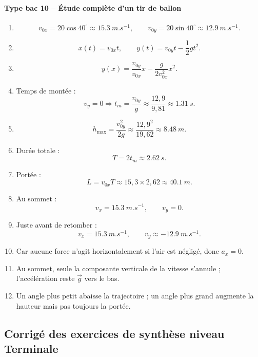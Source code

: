 \documentclass[11pt,a4paper]{article}
\theoremstyle{definition}
\begin{document}
\paragraph{Type bac 10 -- Étude complète d’un tir de ballon}
\begin{enumerate}[label=\arabic*.]
    \item
    \[
    v_{0x}=20\cos40^\circ\approx \SI{15,3}{m.s^{-1}},
    \qquad
    v_{0y}=20\sin40^\circ\approx \SI{12,9}{m.s^{-1}}.
    \]
    \item
    \[
    x(t)=v_{0x}t,\qquad y(t)=v_{0y}t-\frac12 gt^2.
    \]
    \item
    \[
    y(x)=\frac{v_{0y}}{v_{0x}}x-\frac{g}{2v_{0x}^2}x^2.
    \]
    \item Temps de montée :
    \[
    v_y=0 \Rightarrow t_m=\frac{v_{0y}}{g}\approx \frac{12,9}{9,81}\approx \SI{1,31}{s}.
    \]
    \item
    \[
    h_{\max}=\frac{v_{0y}^2}{2g}\approx \frac{12,9^2}{19,62}\approx \SI{8,48}{m}.
    \]
    \item Durée totale :
    \[
    T=2t_m\approx \SI{2,62}{s}.
    \]
    \item Portée :
    \[
    L=v_{0x}T\approx 15,3\times2,62\approx \SI{40,1}{m}.
    \]
    \item Au sommet :
    \[
    v_x=\SI{15,3}{m.s^{-1}},\qquad v_y=0.
    \]
    \item Juste avant de retomber :
    \[
    v_x=\SI{15,3}{m.s^{-1}},\qquad v_y\approx \SI{-12,9}{m.s^{-1}}.
    \]
    \item Car aucune force n’agit horizontalement si l’air est négligé, donc $a_x=0$.
    \item Au sommet, seule la composante verticale de la vitesse s’annule ; l’accélération reste $\vec g$ vers le bas.
    \item Un angle plus petit abaisse la trajectoire ; un angle plus grand augmente la hauteur mais pas toujours la portée.
\end{enumerate}

\subsection{Corrigé des exercices de synthèse niveau Terminale}
\end{document}
